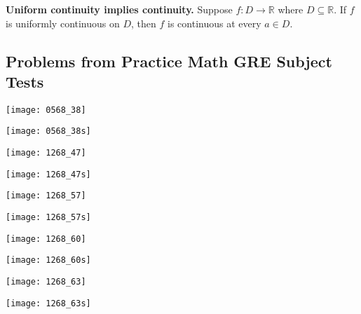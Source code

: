 \textbf{Uniform continuity implies continuity.} Suppose \(f:D \to \mathbb{R}\) where \(D \subseteq \mathbb{R}\). If \(f\) is uniformly continuous on \(D\), then \(f\) is continuous at every \(a \in D\).

\subsection{Problems from Practice Math GRE Subject Tests}

%

\texttt{[image: 0568\_38]}

\texttt{[image: 0568\_38s]}

\texttt{[image: 1268\_47]}

\texttt{[image: 1268\_47s]}

\texttt{[image: 1268\_57]}

\texttt{[image: 1268\_57s]}

\texttt{[image: 1268\_60]}

\texttt{[image: 1268\_60s]}

\texttt{[image: 1268\_63]}

\texttt{[image: 1268\_63s]}